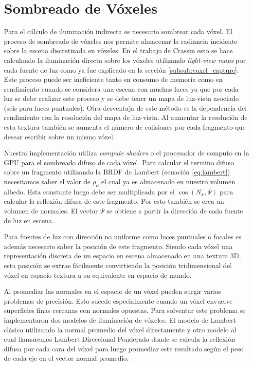 \section{Sombreado de Vóxeles} %
\label{sec:sombreado_de_voxeles}
Para el cálculo de iluminación indirecta es necesario sombrear cada vóxel. El proceso de sombreado de vóxeles nos permite almacenar la radiancia incidente sobre la escena discretizada en vóxeles. En el trabajo de Crassin esto se hace calculando la iluminación directa sobre los vóxeles utilizando \emph{light-view maps} por cada fuente de luz como ya fue explicado en la sección \ref{subsub:voxel_capture}. Este proceso puede ser ineficiente tanto en consumo de memoria como en rendimiento cuando se considera una escena con muchas luces ya que por cada luz se debe realizar este proceso y se debe tener un mapa de luz-vista asociado (seis para luces puntuales). Otra desventaja de este método es la dependencia del rendimiento con la resolución del mapa de luz-vista. Al aumentar la resolución de esta textura también se aumenta el número de colisiones por cada fragmento que desear escribir sobre un mismo vóxel.

Nuestra implementación utiliza \emph{compute shaders} o el procesador de computo en la \ac{GPU} para el sombreado difuso de cada vóxel. Para calcular el termino difuso sobre un fragmento utilizando la \ac{BRDF} de Lambert (ecuación \ref{eq:lambert}) necesitamos saber el valor de $\rho_{d}$ el cual ya es almacenado en nuestro volumen albedo. Esta constante luego debe ser multiplicada por el $\cos(N_{x}, \Psi)$ para calcular la reflexión difusa de este fragmento. Por esto también se crea un volumen de normales. El vector $\Psi$ se obtiene a partir la dirección de cada fuente de luz en escena.

Para fuentes de luz con dirección no uniforme como luces puntuales o focales es además necesario saber la posición de este fragmento. Siendo cada vóxel una representación discreta de un espacio en escena almacenado en una textura 3D, esta posición se extrae fácilmente convirtiendo la posición tridimensional del vóxel en espacio textura a su equivalente en espacio de mundo.

Al promediar las normales en el espacio de un vóxel pueden surgir varios problemas de precisión. Esto sucede especialmente cuando un vóxel envuelve superficies finas cercanas con normales opuestas. Para solventar este problema se implementaron dos modelos de iluminación de vóxeles. El modelo de Lambert clásico utilizando la normal promedio del vóxel directamente y otro modelo al cual llamaremos Lambert Direccional Ponderado donde se calcula la reflexión difusa por cada cara del vóxel para luego promediar este resultado según el peso de cada eje en el vector normal promedio.

